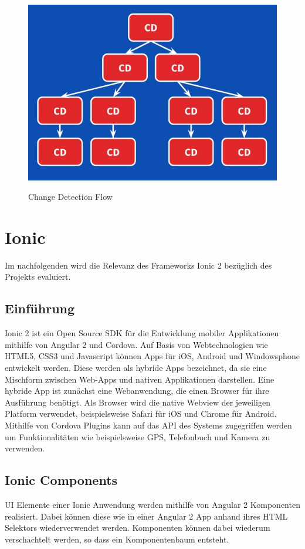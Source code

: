 \begin{figure}[ht]
 \centering
 \includegraphics[width=0.7\linewidth]{kapitel3/cd-tree.jpg}
 \caption{Change Detection Flow}\cite{changedetection-explained}
\end{figure}

\newpage
\section{Ionic}

Im nachfolgenden wird die Relevanz des Frameworks Ionic 2 bezüglich des Projekts \projectname{} evaluiert.

\subsection{Einführung}

Ionic 2 ist ein Open Source \ac{SDK} für die Entwicklung mobiler Applikationen mithilfe von Angular 2 und Cordova.
Auf Basis von Webtechnologien wie HTML5, CSS3 und Javascript können Apps für iOS, Android und Windowsphone
entwickelt werden. Diese werden als hybride Apps bezeichnet,
da sie eine Mischform zwischen Web-Apps und nativen Applikationen darstellen.
Eine hybride App ist zunächst eine Webanwendung, die einen Browser für ihre Ausführung benötigt.
Als Browser wird die native Webview der jeweiligen Platform verwendet,
beispielsweise Safari für iOS und Chrome für Android.
Mithilfe von Cordova Plugins kann auf das \ac{API} des Systems zugegriffen werden um Funktionalitäten wie beispielsweise GPS, Telefonbuch und Kamera zu verwenden.
\cite{ionic34:online}

\subsection{Ionic Components}

\ac{UI} Elemente einer Ionic Anwendung werden mithilfe von Angular 2 Komponenten realisiert.
Dabei können diese wie in einer Angular 2 App anhand ihres HTML Selektors wiederverwendet werden.
Komponenten können dabei wiederum verschachtelt werden, so dass ein Komponentenbaum entsteht.

